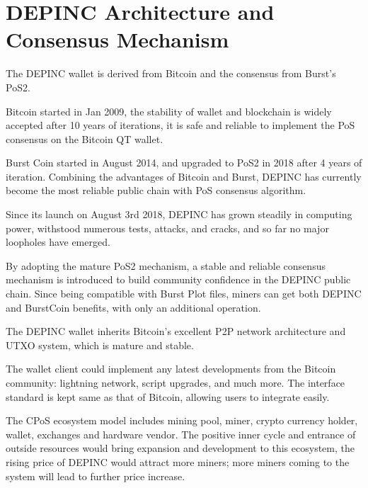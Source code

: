 \section{DEPINC Architecture and Consensus Mechanism}
\begin{flushleft}
    The DEPINC wallet is derived from Bitcoin and the consensus from Burst's PoS2.
\end{flushleft}
\begin{flushleft}
    Bitcoin started in Jan 2009, the stability of wallet and blockchain is widely accepted after 10 years of iterations, it is safe and reliable to implement the PoS consensus on the Bitcoin QT wallet.
\end{flushleft}
\begin{flushleft}
    Burst Coin started in August 2014, and upgraded to PoS2 in 2018 after 4 years of iteration. Combining the advantages of Bitcoin and Burst, DEPINC has currently become the most reliable public chain with PoS consensus algorithm.
\end{flushleft}
\begin{flushleft}
    Since its launch on August 3rd 2018, DEPINC has grown steadily in computing power, withstood numerous tests, attacks, and cracks, and so far no major loopholes have emerged.
\end{flushleft}
\begin{flushleft}
    By adopting the mature PoS2 mechanism, a stable and reliable consensus mechanism is introduced to build community confidence in the DEPINC public chain. Since being compatible with Burst Plot files, miners can get both DEPINC and BurstCoin benefits, with only an additional operation.
\end{flushleft}
\begin{flushleft}
    The DEPINC wallet inherits Bitcoin's excellent P2P network architecture and UTXO system, which is mature and stable.
\end{flushleft}
\begin{flushleft}
    The wallet client could implement any latest developments from the Bitcoin community: lightning network, script upgrades, and much more. The interface standard is kept same as that of Bitcoin, allowing users to integrate easily.
\end{flushleft}
\begin{flushleft}
    The CPoS ecosystem model includes mining pool, miner, crypto currency holder, wallet, exchanges and hardware vendor. The positive inner cycle and entrance of outside resources would bring expansion and development to this ecosystem, the rising price of DEPINC would attract more miners; more miners coming to the system will lead to further price increase.
\end{flushleft}
